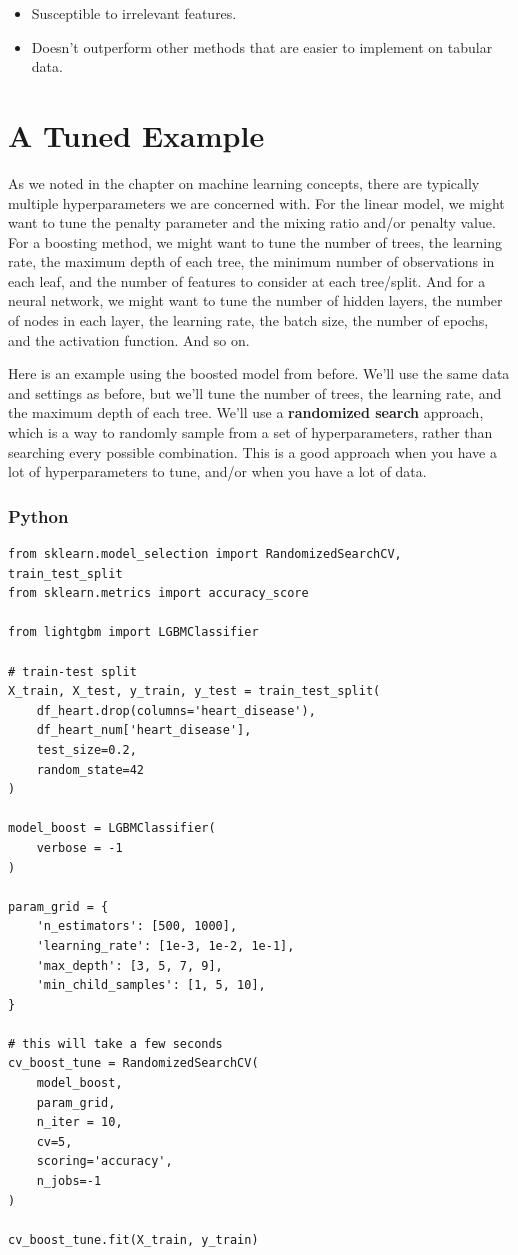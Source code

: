 \documentclass[
  letterpaper,
]{krantz}
\providecommand{\tightlist}{%
  \setlength{\itemsep}{0pt}\setlength{\parskip}{0pt}}\usepackage{longtable,booktabs,array}
\begin{document}
\begin{itemize}
\tightlist
\item
  Susceptible to irrelevant features.
\item
  Doesn't outperform other methods that are easier to implement on
  tabular data.
\end{itemize}

\section{A Tuned Example}\label{sec-ml-tuned-ex}

As we noted in the chapter on machine learning concepts, there are
typically multiple hyperparameters we are concerned with. For the linear
model, we might want to tune the penalty parameter and the mixing ratio
and/or penalty value. For a boosting method, we might want to tune the
number of trees, the learning rate, the maximum depth of each tree, the
minimum number of observations in each leaf, and the number of features
to consider at each tree/split. And for a neural network, we might want
to tune the number of hidden layers, the number of nodes in each layer,
the learning rate, the batch size, the number of epochs, and the
activation function. And so on.

Here is an example using the boosted model from before. We'll use the
same data and settings as before, but we'll tune the number of trees,
the learning rate, and the maximum depth of each tree. We'll use a
\textbf{randomized search} approach, which is a way to randomly sample
from a set of hyperparameters, rather than searching every possible
combination. This is a good approach when you have a lot of
hyperparameters to tune, and/or when you have a lot of data.

\subsubsection{Python}

\begin{verbatim}
from sklearn.model_selection import RandomizedSearchCV, train_test_split
from sklearn.metrics import accuracy_score

from lightgbm import LGBMClassifier

# train-test split
X_train, X_test, y_train, y_test = train_test_split(
    df_heart.drop(columns='heart_disease'), 
    df_heart_num['heart_disease'],
    test_size=0.2,
    random_state=42
)

model_boost = LGBMClassifier(
    verbose = -1
)

param_grid = {
    'n_estimators': [500, 1000],
    'learning_rate': [1e-3, 1e-2, 1e-1],
    'max_depth': [3, 5, 7, 9],
    'min_child_samples': [1, 5, 10],
}

# this will take a few seconds
cv_boost_tune = RandomizedSearchCV(
    model_boost, 
    param_grid, 
    n_iter = 10,
    cv=5, 
    scoring='accuracy', 
    n_jobs=-1
)

cv_boost_tune.fit(X_train, y_train)
\end{verbatim}
\end{document}
